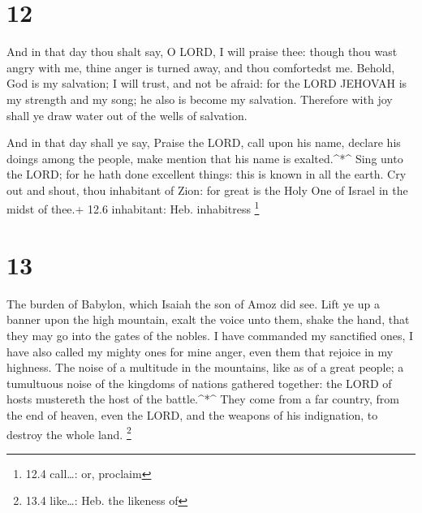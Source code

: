 \hypertarget{section-11}{%
\section{12}\label{section-11}}

 And in that day thou shalt say, O LORD, I will praise thee:
though thou wast angry with me, thine anger is turned away, and thou
comfortedst me.  Behold, God is my salvation; I will trust,
and not be afraid: for the LORD JEHOVAH is my strength and my song; he
also is become my salvation.  Therefore with joy shall ye
draw water out of the wells of salvation.

 And in that day shall ye say, Praise the LORD, call upon
his name, declare his doings among the people, make mention that his
name is exalted.\^{}*\^{}  Sing unto the LORD; for he hath
done excellent things: this is known in all the earth.  Cry
out and shout, thou inhabitant of Zion: for great is the Holy One of
Israel in the midst of thee.+ 12.6 inhabitant: Heb. inhabitress
\footnote{12.4 call\ldots: or, proclaim}

\hypertarget{section-12}{%
\section{13}\label{section-12}}

 The burden of Babylon, which Isaiah the son of Amoz did
see.  Lift ye up a banner upon the high mountain, exalt the
voice unto them, shake the hand, that they may go into the gates of the
nobles.  I have commanded my sanctified ones, I have also
called my mighty ones for mine anger, even them that rejoice in my
highness.  The noise of a multitude in the mountains, like
as of a great people; a tumultuous noise of the kingdoms of nations
gathered together: the LORD of hosts mustereth the host of the
battle.\^{}*\^{}  They come from a far country, from the end
of heaven, even the LORD, and the weapons of his indignation, to destroy
the whole land. \footnote{13.4 like\ldots: Heb. the likeness of}

